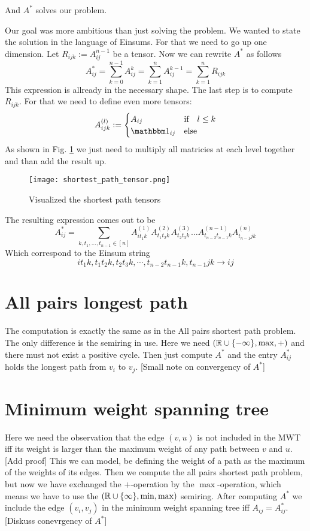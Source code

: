 And $A^*$ solves our problem.

Our goal was more ambitious than just solving the problem. We wanted to state the solution in the language of Einsums. For that we need to go up one dimension. Let $R_{ijk} := A^{n-1}_{ij}$ be a tensor. Now we can rewrite $A^*$ as follows
$$A^*_{ij} = \sum_{k=0}^{n-1} A^k_{ij} = \sum_{k=1}^{n}A^{k-1}_{ij} = \sum_{k=1}^{n}R_{ijk}$$
This expression is allready in the necessary shape. The last step is to compute $R_{ijk}$. For that we need to define even more tensors: 
$$A^{(l)}_{ijk} := 
\begin{cases}
    A_{ij} & \textrm{if}\quad l \leq k\\
    \imat_{ij} & \textrm{else}   
\end{cases}
$$
As shown in Fig. \ref*{fig:shortest_path_tensor} we just need to multiply all matricies at each level together and than add the result up.

\begin{figure}[h]
    \texttt{[image: shortest\_path\_tensor.png]}
    \caption{Visualized the shortest path tensors}
    \label{fig:shortest_path_tensor}
\end{figure}

The resulting expression comes out to be
$$A^*_{ij} = \sum_{k, t_1, \dots, t_{n-1} \in [n]} A^{(1)}_{it_1k}A^{(2)}_{t_1t_2k}A^{(3)}_{t_2t_3k}\dots A^{(n-1)}_{t_{n-2}t_{n-1}k}A^{(n)}_{t_{n-1}jk}$$
Which correspond to the Einsum string
$$it_1k, t_1t_2k, t_2t_3k, \cdots, t_{n-2}t_{n-1}k, t_{n-1}jk \to ij$$

\section{All pairs longest path}
The computation is exactly the same as in the All pairs shortest path problem. The only difference is the semiring in use. Here we need $(\mathbb{R} \cup \{-\infty\}, \max, +)$ and there must not exist a positive cycle. Then just compute $A^*$ and the entry $A^*_{ij}$ holds the longest path from $v_i$ to $v_j$. [Small note on convergency of $A^*$]

\section{Minimum weight spanning tree}
Here we need the observation that the edge $(v, u)$ is not included in the MWT iff its weight is larger than the maximum weight of any path between $v$ and $u$. [Add proof] This we can model, be defining the weight of a path as the maximum of the weights of its edges. Then we compute the all pairs shortest path problem, but now we have exchanged the $+$-operation by the $\max$-operation, which means we have to use the $(\mathbb{R} \cup\{\infty\}, \min, \max)$ semiring. After computing $A^*$ we include the edge $(v_i, v_j)$ in the minimum weight spanning tree iff $A_{ij} = A^*_{ij}$.
[Diskuss conevrgency of $A^*$]